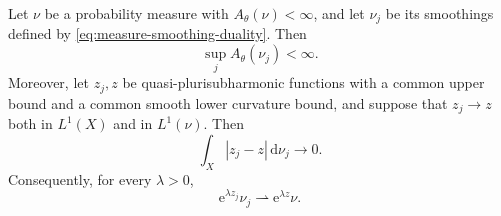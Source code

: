 \begin{lemma}\label{lem:measure-smoothing-integrals}
Let $\nu$ be a probability measure with $A_\theta(\nu)<\infty$, and let $\nu_j$ be its smoothings defined by \eqref{eq:measure-smoothing-duality}. Then
\[
 \sup_j A_\theta(\nu_j)<\infty.
\]
Moreover, let $z_j,z$ be quasi-plurisubharmonic functions with a common upper bound and a common smooth lower curvature bound, and suppose that $z_j\to z$ both in $L^1(X)$ and in $L^1(\nu)$. Then
\begin{equation}\label{eq:convolution-moving-integrals}
 \int_X|z_j-z|\,\mathrm{d}\nu_j\longrightarrow0.
\end{equation}
Consequently, for every $\lambda>0$,
\[
 \mathrm{e}^{\lambda z_j}\nu_j\rightharpoonup \mathrm{e}^{\lambda z}\nu.
\]
\end{lemma}
